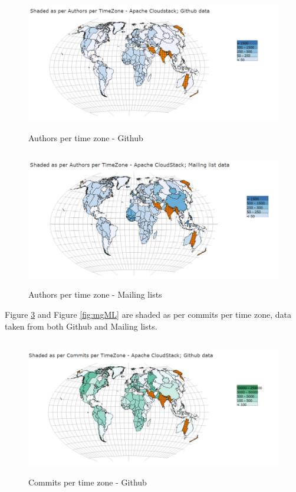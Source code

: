 \documentclass[double,12pt]{beavtex}
\begin{document}
\begin{figure}[H]
\centering
\includegraphics[width=130mm,height=60mm]{image4.PNG}
\caption{Authors per time zone - Github}
\label{fig:auHub}
\end{figure}

\begin{figure}[H]
\centering
\includegraphics[width=130mm,height=60mm]{image5.PNG}
\caption{Authors per time zone - Mailing lists}
\label{fig:auML}
\end{figure}

Figure \ref{fig:coHub} and Figure \ref{fig:mgML} are shaded as per commits per time zone, data taken from both Github and Mailing lists.

\begin{figure}[H]
\centering
\includegraphics[width=130mm,height=60mm]{image6.PNG}
\caption{Commits per time zone - Github}
\label{fig:coHub}
\end{figure}
\end{document}
